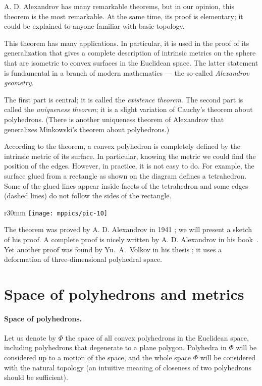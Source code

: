 \documentclass[oneside,a4paper]{article}
\begin{document}
A. D. Alexandrov has many remarkable theorems, but in our opinion, this theorem is the most remarkable.
At the same time, its proof is elementary;
it could be explained to anyone familiar with basic topology.

This theorem has many applications.
In particular, it is used in the proof of its generalization \cite{alexandrov-1948} that gives a complete description of intrinsic metrics on the sphere that are isometric to convex surfaces in the Euclidean space.
The latter statement is fundamental in a branch of modern mathematics --- the so-called \emph{Alexandrov geometry}.

The first part is central; it is called the \emph{existence theorem}.
The second part is called the \emph{uniqueness theorem}; it is a slight variation of Cauchy's theorem about polyhedrons.
(There is another uniqueness theorem of Alexandrov that generalizes Minkowski's theorem about  polyhedrons.)

According to the theorem, a convex polyhedron is completely defined by the intrinsic metric of its surface.
In particular, knowing the metric we could find the position of the edges.
However, in practice, it is not easy to do.
For example, the surface glued from a rectangle as shown on the diagram defines a tetrahedron.
Some of the glued lines appear inside facets of the tetrahedron and some edges (dashed lines) do not follow the sides of the rectangle.

{

\begin{wrapfigure}{r}{30mm}
\vskip-3mm
\centering
\texttt{[image: mppics/pic-10]}
\vskip-0mm
\end{wrapfigure}

The theorem was proved by A. D. Alexandrov in 1941 \cite{alexandrov-1941};
we will present a sketch of his proof.
A complete proof is nicely written by A. D. Alexandrov in his book~\cite{alexandrov}.
Yet another proof was found by Yu.~A.~Volkov in his thesis \cite{volkov};
it uses a deformation of three-dimensional polyhedral space.

}

\section{Space of polyhedrons and metrics}

\paragraph{Space of polyhedrons.}
Let us denote by $\Phi$ the space of all convex polyhedrons in the Euclidean space,
including polyhedrons that degenerate to a plane polygon.
Polyhedra in $\Phi$ will be considered up to a motion of the space, 
and the whole space $\Phi$ will be considered with the natural topology (an intuitive meaning of closeness of two polyhedrons should be sufficient).  
\end{document}
